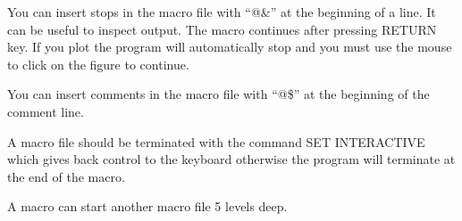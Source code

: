 \documentclass[12pt]{article}
\begin{document}
You can insert stops in the macro file with ``@\&'' at the beginning
of a line.  It can be useful to inspect output.  The macro continues
after pressing RETURN key.  If you plot the program will automatically
stop and you must use the mouse to click on the figure to continue.

You can insert comments in the macro file with ``@\$'' at the beginning
of the comment line.

A macro file should be terminated with the command SET INTERACTIVE
which gives back control to the keyboard otherwise the program will
terminate at the end of the macro.

A macro can start another macro file 5 levels deep.

%
%
%
%
\end{document}
